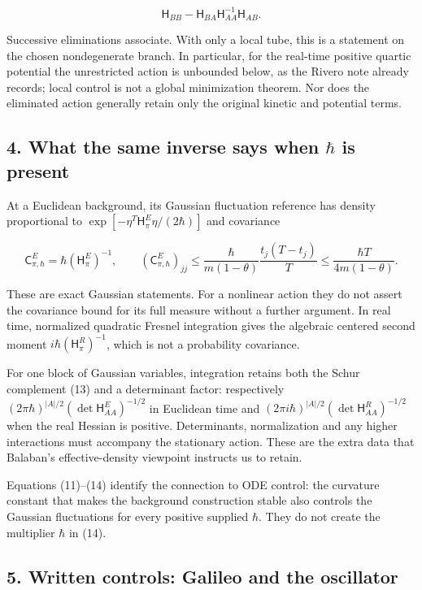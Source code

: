 \documentclass[11pt,a4paper]{article}
\begin{document}
\[
 \mathsf H_{BB}-\mathsf H_{BA}\mathsf H_{AA}^{-1}\mathsf H_{AB}.
 \tag{13}
\]

Successive eliminations associate. With only a local tube, this is a
statement on the chosen nondegenerate branch. In particular, for the
real-time positive quartic potential the unrestricted action is
unbounded below, as the Rivero note already records; local control is
not a global minimization theorem. Nor does the eliminated action
generally retain only the original kinetic and potential terms.

\subsection{\texorpdfstring{4. What the same inverse says when \(\hbar\)
is
present}{4. What the same inverse says when \textbackslash hbar is present}}\label{what-the-same-inverse-says-when-hbar-is-present}

At a Euclidean background, its Gaussian fluctuation reference has
density proportional to \(\exp[-\eta^T\mathsf H_\pi^E\eta/(2\hbar)]\)
and covariance

\[
 \mathsf C_{\pi,\hbar}^E=\hbar(\mathsf H_\pi^E)^{-1},\qquad
 (\mathsf C_{\pi,\hbar}^E)_{jj}
 \le\frac{\hbar}{m(1-\theta)}\frac{t_j(T-t_j)}{T}
 \le\frac{\hbar T}{4m(1-\theta)}.
 \tag{14}
\]

These are exact Gaussian statements. For a nonlinear action they do not
assert the covariance bound for its full measure without a further
argument. In real time, normalized quadratic Fresnel integration gives
the algebraic centered second moment \(i\hbar(\mathsf H_\pi^R)^{-1}\),
which is not a probability covariance.

For one block of Gaussian variables, integration retains both the Schur
complement (13) and a determinant factor: respectively
\((2\pi\hbar)^{|A|/2}(\det\mathsf H_{AA}^E)^{-1/2}\) in Euclidean time
and \((2\pi i\hbar)^{|A|/2}(\det\mathsf H_{AA}^R)^{-1/2}\) when the real
Hessian is positive. Determinants, normalization and any higher
interactions must accompany the stationary action. These are the extra
data that Balaban's effective-density viewpoint instructs us to retain.

Equations (11)--(14) identify the connection to ODE control: the
curvature constant that makes the background construction stable also
controls the Gaussian fluctuations for every positive supplied
\(\hbar\). They do not create the multiplier \(\hbar\) in (14).

\subsection{5. Written controls: Galileo and the
oscillator}\label{written-controls-galileo-and-the-oscillator}
\end{document}
